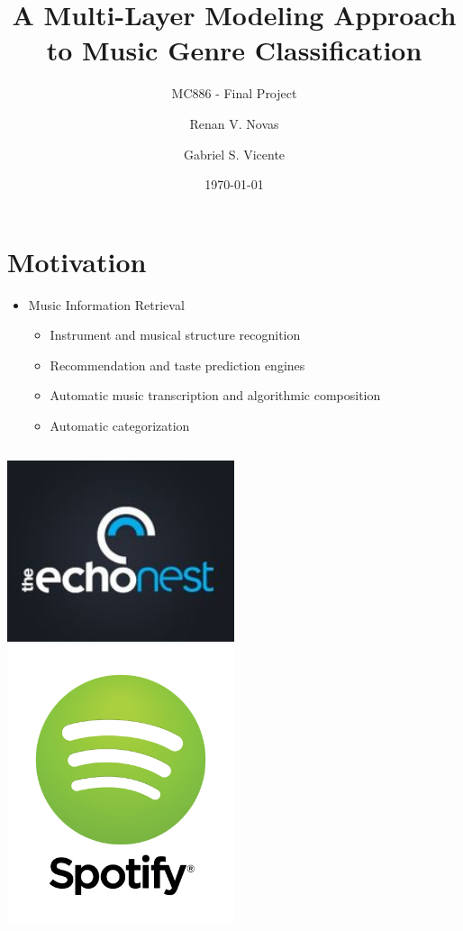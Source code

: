 \documentclass{beamer}
\title{A Multi-Layer Modeling Approach to Music Genre Classification}
\subtitle{MC886 - Final Project}
\author{Renan V. Novas \and Gabriel S. Vicente}
\institute{Universidade Estadual de Campinas}
\date{\today}
\begin{document}
\begin{frame}
\titlepage
\end{frame}

\section{Motivation}
\begin{frame}

\begin{itemize}
  \item \alert{Music Information Retrieval}
  \begin{itemize}
  \item Instrument and musical structure recognition
  \item Recommendation and taste prediction engines
  \item Automatic music transcription and algorithmic composition 
  \item Automatic categorization
  \end{itemize}
\end{itemize}

\begin{columns}[t]
\begin{column}{.5\textwidth}
\includegraphics[width=0.5\textwidth]{../Report/img/LogoTheEchoNest.jpg}
\hspace*{0.15in}
\includegraphics[width=0.5\textwidth]{img/LogoSpotiy.jpg}


\end{column}
\end{columns}
\end{frame}
\end{document}
